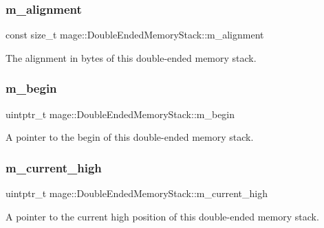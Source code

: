 \subsubsection{\texorpdfstring{m\+\_\+alignment}{m\_alignment}}
{\footnotesize\ttfamily const size\+\_\+t mage\+::\+Double\+Ended\+Memory\+Stack\+::m\+\_\+alignment\hspace{0.3cm}{\ttfamily [private]}}

The alignment in bytes of this double-\/ended memory stack. \hypertarget{classmage_1_1_double_ended_memory_stack_aee3d3cf829712607a9859e72abd5ab7f}{}\label{classmage_1_1_double_ended_memory_stack_aee3d3cf829712607a9859e72abd5ab7f} 
\subsubsection{\texorpdfstring{m\+\_\+begin}{m\_begin}}
{\footnotesize\ttfamily uintptr\+\_\+t mage\+::\+Double\+Ended\+Memory\+Stack\+::m\+\_\+begin\hspace{0.3cm}{\ttfamily [private]}}

A pointer to the begin of this double-\/ended memory stack. \hypertarget{classmage_1_1_double_ended_memory_stack_a22cfadce68da8cdcc480ccd44707b5cf}{}\label{classmage_1_1_double_ended_memory_stack_a22cfadce68da8cdcc480ccd44707b5cf} 
\subsubsection{\texorpdfstring{m\+\_\+current\+\_\+high}{m\_current\_high}}
{\footnotesize\ttfamily uintptr\+\_\+t mage\+::\+Double\+Ended\+Memory\+Stack\+::m\+\_\+current\+\_\+high\hspace{0.3cm}{\ttfamily [private]}}

A pointer to the current high position of this double-\/ended memory stack. \hypertarget{classmage_1_1_double_ended_memory_stack_a8a97b154eaab706e7d293ef00404269d}{}\label{classmage_1_1_double_ended_memory_stack_a8a97b154eaab706e7d293ef00404269d} 
